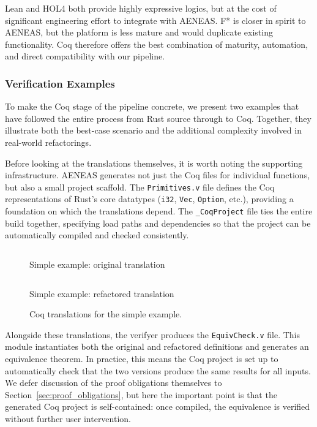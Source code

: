 Lean and HOL4 both provide highly expressive logics, but at the cost of
significant engineering effort to integrate with AENEAS. F* is closer in spirit
to AENEAS, but the platform is less mature and would duplicate existing
functionality. Coq therefore offers the best combination of maturity,
automation, and direct compatibility with our pipeline.

\subsubsection*{Verification Examples}

To make the Coq stage of the pipeline concrete, we present two examples that
have followed the entire process from Rust source through to Coq. Together, they
illustrate both the best-case scenario and the additional complexity involved in
real-world refactorings.

Before looking at the translations themselves, it is worth noting the supporting
infrastructure. AENEAS generates not just the Coq files for individual
functions, but also a small project scaffold. The \texttt{Primitives.v} file
defines the Coq representations of Rust's core datatypes (\texttt{i32},
\texttt{Vec}, \texttt{Option}, etc.), providing a foundation on which the
translations depend. The \texttt{\_CoqProject} file ties the entire build
together, specifying load paths and dependencies so that the project can be
automatically compiled and checked consistently.

\begin{figure}[h]
  \centering
  \begin{minipage}{0.45\linewidth}
    \inputminted[linenos, breaklines, frame=none, fontsize=\footnotesize]{coq}{3_Chapter3/COQ_example/simple.v}
    \caption*{Simple example: original translation}
  \end{minipage}\hfill
  \begin{minipage}{0.45\linewidth}
    \inputminted[linenos, breaklines, frame=none, fontsize=\footnotesize]{coq}{3_Chapter3/COQ_example/simple_ref.v}
    \caption*{Simple example: refactored translation}
  \end{minipage}
  \caption{Coq translations for the simple example.}
  \label{fig:coq_simple}
\end{figure}

Alongside these translations, the verifyer produces the \texttt{EquivCheck.v}
file. This module instantiates both the original and refactored definitions and
generates an equivalence theorem. In practice, this means the Coq project is set
up to automatically check that the two versions produce the same results for all
inputs. We defer discussion of the proof obligations themselves to
Section~\ref{sec:proof_obligations}, but here the important point is that the
generated Coq project is self-contained: once compiled, the equivalence is
verified without further user intervention.

